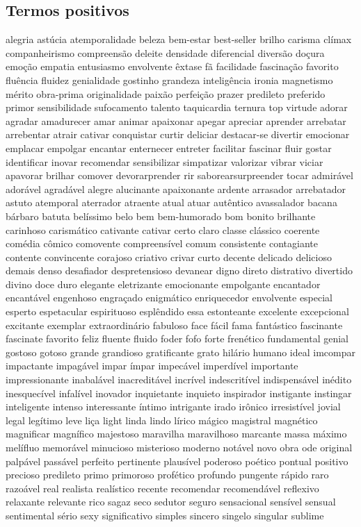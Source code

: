 \subsection{Termos positivos}
alegria ast\'{u}cia atemporalidade beleza bem-estar best-seller brilho carisma cl\'{i}max companheirismo compreens\~ao deleite densidade diferencial divers\~ao do\c{c}ura emo\c{c}\~ao empatia entusiasmo envolvente \^{e}xtase f\~a facilidade fascina\c{c}\~ao favorito flu\^{e}ncia fluidez genialidade gostinho grandeza intelig\^{e}ncia ironia magnetismo m\'{e}rito obra-prima originalidade paix\~ao perfei\c{c}\~ao prazer predileto preferido primor sensibilidade sufocamento talento taquicardia ternura top virtude adorar agradar amadurecer amar animar apaixonar apegar apreciar aprender arrebatar arrebentar atrair cativar conquistar curtir deliciar destacar-se divertir emocionar emplacar empolgar encantar enternecer entreter facilitar fascinar fluir gostar identificar inovar recomendar sensibilizar simpatizar valorizar vibrar viciar apavorar brilhar comover devorarprender rir saborearsurpreender tocar admir\'{a}vel ador\'{a}vel agrad\'{a}vel alegre alucinante apaixonante ardente arrasador arrebatador astuto atemporal aterrador atraente atual atuar aut\^{e}ntico avassalador bacana b\'{a}rbaro batuta bel\'{i}ssimo belo bem bem-humorado bom bonito brilhante carinhoso carism\'{a}tico cativante cativar certo claro classe cl\'{a}ssico coerente com\'{e}dia c\^{o}mico comovente compreens\'{i}vel comum consistente contagiante contente convincente corajoso criativo crivar curto decente delicado delicioso demais denso desafiador despretensioso devanear digno direto distrativo divertido divino doce duro elegante eletrizante emocionante empolgante encantador encant\'{a}vel engenhoso engra\c{c}ado enigm\'{a}tico enriquecedor envolvente especial esperto espetacular espirituoso espl\^{e}ndido essa estonteante excelente excepcional excitante exemplar extraordin\'{a}rio fabuloso face f\'{a}cil fama fant\'{a}stico fascinante fascinate favorito feliz fluente fluido foder fofo forte fren\'{e}tico fundamental genial gostoso gotoso grande grandioso gratificante grato hil\'{a}rio humano ideal imcompar impactante impag\'{a}vel impar \'{i}mpar impec\'{a}vel imperd\'{i}vel importante impressionante inabal\'{a}vel inacredit\'{a}vel incr\'{i}vel indescrit\'{i}vel indispens\'{a}vel in\'{e}dito inesquec\'{i}vel infal\'{i}vel inovador inquietante inquieto inspirador instigante instingar inteligente intenso interessante \'{i}ntimo intrigante irado ir\^{o}nico irresist\'{i}vel jovial legal leg\'{i}timo leve li\c{c}a light linda lindo l\'{i}rico m\'{a}gico magistral magn\'{e}tico magnificar magn\'{i}fico majestoso maravilha maravilhoso marcante massa m\'{a}ximo mel\'{i}fluo memor\'{a}vel minucioso misterioso moderno not\'{a}vel novo obra ode original palp\'{a}vel pass\'{a}vel perfeito pertinente plaus\'{i}vel poderoso po\'{e}tico pontual positivo precioso predileto primo primoroso prof\'{e}tico profundo pungente r\'{a}pido raro razo\'{a}vel real realista real\'{i}stico recente recomendar recomend\'{a}vel reflexivo relaxante relevante rico sagaz seco sedutor seguro sensacional sens\'{i}vel sensual sentimental s\'{e}rio sexy significativo simples sincero singelo singular sublime 